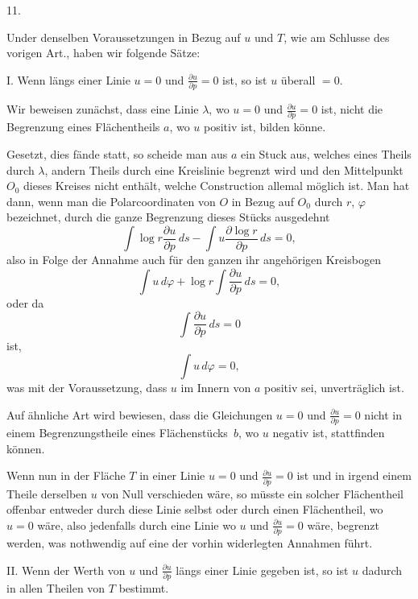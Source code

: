 \documentclass[a4paper,12pt]{article}
\begin{document}
\medbreak

\centerline{11.}

\nobreak\medskip

Under denselben Voraussetzungen in Bezug auf $u$ und $T$, wie am
Schlusse des vorigen Art., haben wir folgende S\"{a}tze:

I.  Wenn l\"{a}ngs einer Linie $u = 0$ und
$\displaystyle \frac{\partial u}{\partial p} = 0$
ist, so ist $u$ \"{u}berall $= 0$.

Wir beweisen zun\"{a}chst, dass eine Linie $\lambda$, wo $u = 0$ und
$\displaystyle \frac{\partial u}{\partial p} = 0$
ist, nicht die Begrenzung eines Fl\"{a}chentheils $a$, wo $u$
positiv ist, bilden k\"{o}nne.

Gesetzt, dies f\"{a}nde statt, so scheide man aus $a$ ein Stuck
aus, welches eines Theils durch $\lambda$, andern Theils durch
eine Kreislinie begrenzt wird und den Mittelpunkt $O_0$ dieses
Kreises nicht enth\"{a}lt, welche Construction allemal
m\"{o}glich ist.  Man hat dann, wenn man die Polarcoordinaten von
$O$ in Bezug auf $O_0$ durch $r$, $\varphi$ bezeichnet, durch die
ganze Begrenzung dieses St\"{u}cks ausgedehnt
\[ \int \log r \frac{\partial u }{\partial p} \, ds
          - \int u  \frac{\partial \log r}{\partial p} \, ds
   = 0,\]
also in Folge der Annahme auch f\"{u}r den ganzen ihr
angeh\"{o}rigen Kreisbogen
\[ \int u \, d \varphi
      + \log r \int \frac{\partial u }{\partial p} \, ds
   = 0,\]
oder da
\[ \int \frac{\partial u}{\partial p} \, ds = 0 \]
ist,
\[ \int u \, d \varphi = 0,\]
was mit der Voraussetzung, dass $u$ im Innern von $a$ positiv
sei, unvertr\"{a}glich ist.

Auf \"{a}hnliche Art wird bewiesen, dass die Gleichungen $u = 0$
und
$\displaystyle \frac{\partial u}{\partial p} = 0$
nicht in einem Begrenzungstheile eines Fl\"{a}chenst\"{u}cks~$b$,
wo $u$ negativ ist, stattfinden k\"{o}nnen.

Wenn nun in der Fl\"{a}che $T$ in einer Linie $u = 0$ und
$\displaystyle \frac{\partial u}{\partial p} = 0$
ist und in irgend einem Theile derselben $u$ von Null verschieden
w\"{a}re, so m\"{u}sste ein solcher Fl\"{a}chentheil offenbar
entweder durch diese Linie selbst oder durch einen
Fl\"{a}chentheil, wo $u = 0$ w\"{a}re, also jedenfalls durch eine
Linie wo $u$ und
$\displaystyle \frac{\partial u}{\partial p} = 0$
w\"{a}re, begrenzt werden, was nothwendig auf eine der vorhin
widerlegten Annahmen f\"{u}hrt.

II.  Wenn der Werth von $u$ und
$\displaystyle \frac{\partial u}{\partial p}$
l\"{a}ngs einer Linie gegeben ist, so ist $u$ dadurch in allen
Theilen von $T$ bestimmt.
\end{document}
